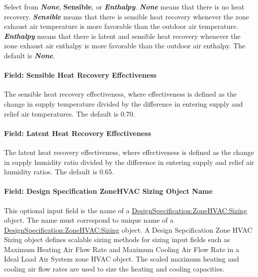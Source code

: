 Select from \textbf{\emph{None}}, \textbf{Sensible}, or \textbf{\emph{Enthalpy}}. \textbf{\emph{None}} means that there is no heat recovery. \textbf{\emph{Sensible}} means that there is sensible heat recovery whenever the zone exhaust air temperature is more favorable than the outdoor air temperature. \textbf{\emph{Enthalpy}} means that there is latent and sensible heat recovery whenever the zone exhaust air enthalpy is more favorable than the outdoor air enthalpy. The default is \textbf{\emph{None}}.

\paragraph{Field: Sensible Heat Recovery Effectiveness}\label{field-sensible-heat-recovery-effectiveness-000}

The sensible heat recovery effectiveness, where effectiveness is defined as the change in supply temperature divided by the difference in entering supply and relief air temperatures. The default is 0.70.

\paragraph{Field: Latent Heat Recovery Effectiveness}\label{field-latent-heat-recovery-effectiveness-000}

The latent heat recovery effectiveness, where effectiveness is defined as the change in supply humidity ratio divided by the difference in entering supply and relief air humidity ratios. The default is 0.65.

\paragraph{Field: Design Specification ZoneHVAC Sizing Object Name}\label{field-design-specification-zonehvac-sizing-object-name-000}

This optional input field is the name of a \hyperref[designspecificationzonehvacsizing]{DesignSpecification:ZoneHVAC:Sizing} object. The name must correspond to unique name of a \hyperref[designspecificationzonehvacsizing]{DesignSpecification:ZoneHVAC:Sizing} object. A Design Sepcification Zone HVAC Sizing object defines scalable sizing methods for sizing input fields such as Maximum Heating Air Flow Rate and Maximum Cooling Air Flow Rate in a Ideal Load Air System zone HVAC object. The scaled maximum heating and cooling air flow rates are used to size the heating and cooling capacities.

